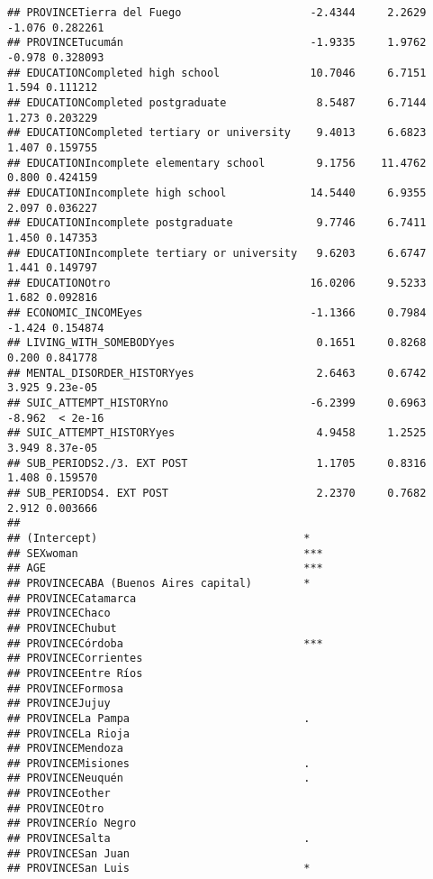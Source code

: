 \documentclass[
]{book}
\begin{document}
\begin{verbatim}
## PROVINCETierra del Fuego                    -2.4344     2.2629  -1.076 0.282261
## PROVINCETucumán                             -1.9335     1.9762  -0.978 0.328093
## EDUCATIONCompleted high school              10.7046     6.7151   1.594 0.111212
## EDUCATIONCompleted postgraduate              8.5487     6.7144   1.273 0.203229
## EDUCATIONCompleted tertiary or university    9.4013     6.6823   1.407 0.159755
## EDUCATIONIncomplete elementary school        9.1756    11.4762   0.800 0.424159
## EDUCATIONIncomplete high school             14.5440     6.9355   2.097 0.036227
## EDUCATIONIncomplete postgraduate             9.7746     6.7411   1.450 0.147353
## EDUCATIONIncomplete tertiary or university   9.6203     6.6747   1.441 0.149797
## EDUCATIONOtro                               16.0206     9.5233   1.682 0.092816
## ECONOMIC_INCOMEyes                          -1.1366     0.7984  -1.424 0.154874
## LIVING_WITH_SOMEBODYyes                      0.1651     0.8268   0.200 0.841778
## MENTAL_DISORDER_HISTORYyes                   2.6463     0.6742   3.925 9.23e-05
## SUIC_ATTEMPT_HISTORYno                      -6.2399     0.6963  -8.962  < 2e-16
## SUIC_ATTEMPT_HISTORYyes                      4.9458     1.2525   3.949 8.37e-05
## SUB_PERIODS2./3. EXT POST                    1.1705     0.8316   1.408 0.159570
## SUB_PERIODS4. EXT POST                       2.2370     0.7682   2.912 0.003666
##                                               
## (Intercept)                                *  
## SEXwoman                                   ***
## AGE                                        ***
## PROVINCECABA (Buenos Aires capital)        *  
## PROVINCECatamarca                             
## PROVINCEChaco                                 
## PROVINCEChubut                                
## PROVINCECórdoba                            ***
## PROVINCECorrientes                            
## PROVINCEEntre Ríos                            
## PROVINCEFormosa                               
## PROVINCEJujuy                                 
## PROVINCELa Pampa                           .  
## PROVINCELa Rioja                              
## PROVINCEMendoza                               
## PROVINCEMisiones                           .  
## PROVINCENeuquén                            .  
## PROVINCEother                                 
## PROVINCEOtro                                  
## PROVINCERío Negro                             
## PROVINCESalta                              .  
## PROVINCESan Juan                              
## PROVINCESan Luis                           *  

\end{verbatim}
\end{document}
